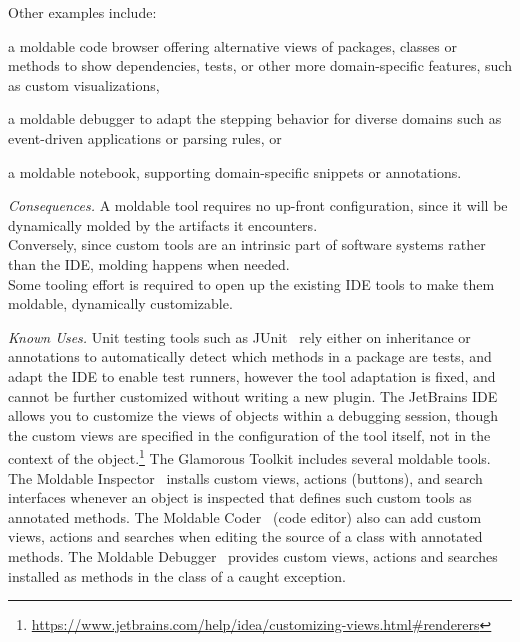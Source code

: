 \documentclass[acmsmall,screen,authorversion,nonacm]{acmart} %
\newcommand\cp[1]{\nbe{Cesare}{#1}{olive}} %
\newcommand\ws[1]{\nbe{Workshop}{#1}{teal}} %
\newcommand{\patsec}[1]{\noindent\textit{#1.}\xspace}
\begin{document}
Other examples include:
\begin{inparaenum}[(i)]
\item a moldable code browser offering alternative views of packages, classes or methods to show dependencies, tests, or other more domain-specific features, such as custom visualizations,
\item a moldable debugger to adapt the stepping behavior for diverse domains such as event-driven applications or parsing rules, 
or
\item a moldable notebook, supporting domain-specific snippets or annotations.
\end{inparaenum}

\patsec{Consequences}
A moldable tool requires no up-front configuration, since it will be dynamically molded by the artifacts it encounters.\\
Conversely, since custom tools are an intrinsic part of software systems rather than the IDE, molding happens when needed.\\
Some tooling effort is required to open up the existing IDE tools to make them moldable, \ie dynamically customizable.


\patsec{Known Uses}
Unit testing tools such as JUnit~\cite{Beck98a} rely either on inheritance or annotations to automatically detect which methods in a package are tests, and adapt the IDE to enable test runners, however the tool adaptation is fixed, and cannot be further customized without writing a new plugin.
The JetBrains IDE allows you to customize the views of objects within a debugging session, though the custom views are specified in the configuration of the tool itself, not in the context of the object.\footnote{\href{https://web.archive.org/web/20240523010248/https://www.jetbrains.com/help/idea/customizing-views.html\#renderers}{https://www.jetbrains.com/help/idea/customizing-views.html\#renderers}}
The Glamorous Toolkit includes several moldable tools.
The Moldable Inspector~\cite{Chis14a} installs custom views, actions (\ie buttons), and search interfaces whenever an object is inspected that defines such custom tools as annotated methods.
The Moldable Coder~\cite{Syre17a} (\ie code editor) also can add custom views,  actions and searches when editing the source of a class with annotated methods.
The Moldable Debugger~\cite{Chis24a} provides custom views, actions and searches installed as methods in the class of a caught exception.
\end{document}
